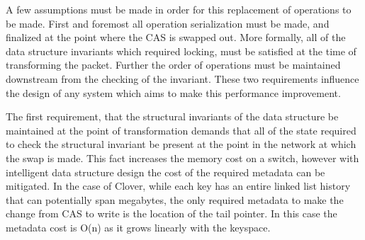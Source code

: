 A few assumptions must be made in order for this replacement of operations to be
made. First and foremost all operation serialization must be made, and finalized
at the point where the CAS is swapped out. More formally, all of the data
structure invariants which required locking, must be satisfied at the time of
transforming the packet. Further the order of operations must be maintained
downstream from the checking of the invariant. These two requirements influence
the design of any system which aims to make this performance improvement.





 

The first requirement, that the structural invariants
of the data structure be maintained at the point of transformation demands that
all of the state required to check the structural invariant be present at the
point in the network at which the swap is made. This fact increases the memory
cost on a switch, however with intelligent data structure design the cost of the
required metadata can be mitigated. In the case of Clover, while each key has
an entire linked list history that can potentially span megabytes, the only
required metadata to make the change from CAS to write is the location of the
tail pointer. In this case the metadata cost is O(n) as it grows linearly with
the keyspace.


